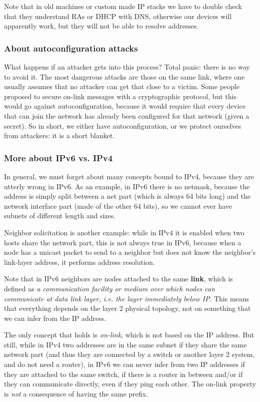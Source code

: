 Note that in old machines or custom made IP stacks we have to double check that they understand RAs or DHCP with DNS, otherwise our devices will apparently work, but they will not be able to resolve addresses.


\subsubsection{About autoconfiguration attacks}

What happens if an attacker gets into this process? Total panic: there is no way to avoid it. The most dangerous attacks are those on the same link, where one usually assumes that no attacker can get that close to a victim. Some people proposed to secure on-link messages with a cryptographic protocol, but this would go against autoconfiguration, because it would require that every device that can join the network has already been configured for that network (given a secret). So in short, we either have autoconfiguration, or we protect ourselves from attackers: it is a short blanket.


\subsubsection{More about IPv6 vs. IPv4}
In general, we must forget about many concepts bound to IPv4, because they are utterly wrong in IPv6. As an example, in IPv6 there is no netmask, because the address is simply split between a net part (which is always 64 bits long) and the network interface part (made of the other 64 bits), so we cannot ever have subnets of different length and sizes.

Neighbor solicitation is another example: while in IPv4 it is enabled when two hosts share the network part, this is not always true in IPv6, because when a node has a unicast packet to send to a neighbor but does not know the neighbor’s link-layer address, it performs address resolution.

Note that in IPv6 neighbors are nodes attached to the same \textbf{link}, which is defined as \textit{a communication facility or medium over which nodes can communicate at data link layer, i.e. the layer immediately below IP}. This means that everything depends on the layer 2 physical topology, not on something that we can infer from the IP address.

The only concept that holds is \textit{on-link}, which is not based on the IP address. But still, while in IPv4 two addresses are in the same subnet if they share the same network part (and thus they are connected by a switch or another layer 2 system, and do not need a router), in IPv6 we can never infer from two IP addresses if they are attached to the same switch, if there is a router in between and/or if they can communicate directly, even if they ping each other. The on-link property is \textit{not} a consequence of having the same prefix.

